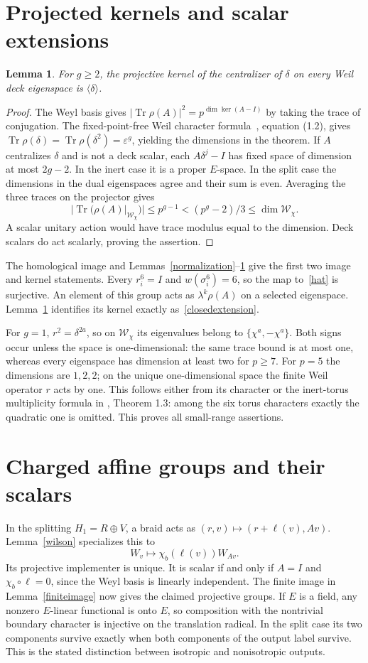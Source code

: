 \documentclass[11pt]{amsart}
\newtheorem{lemma}[theorem]{Lemma}
\newcommand{\Tr}{\operatorname{Tr}}
\begin{document}
\section{Projected kernels and scalar extensions}
\begin{lemma}\label{projectedkernel}
For $g\ge2$, the projective kernel of the centralizer of $\delta$
on every Weil deck eigenspace is $\langle\delta\rangle$.
\end{lemma}
\begin{proof}
The Weyl basis gives
$|\Tr\rho(A)|^2=p^{\dim\ker(A-I)}$ by taking the trace of conjugation.
The fixed-point-free Weil character formula~\cite{GH}, equation (1.2),
gives $\Tr\rho(\delta)=\Tr\rho(\delta^2)=\varepsilon^g$, yielding
the dimensions in the theorem. If $A$ centralizes $\delta$ and is
not a deck scalar, each $A\delta^j-I$ has fixed space of dimension
at most $2g-2$. In the inert case it is a proper $E$-space. In the
split case the dimensions in the dual eigenspaces agree and their
sum is even. Averaging the three traces on the projector gives
\[
|\Tr(\rho(A)|_{\mathscr W_\chi})|\le p^{g-1}
<(p^g-2)/3\le\dim\mathscr W_\chi.
\]
A scalar unitary action would have trace modulus equal to the
dimension. Deck scalars do act scalarly, proving the assertion.
\end{proof}

The homological image and Lemmas~\ref{normalization}--\ref{projectedkernel}
give the first two image and kernel statements. Every $r_i^6=I$
and $w(\sigma_i^6)=6$, so the map to~\eqref{hat} is surjective.
An element of this group acts as $\lambda^k\rho(A)$ on a selected
eigenspace. Lemma~\ref{projectedkernel} identifies its kernel exactly
as~\eqref{closedextension}.

For $g=1$, $r^2=\delta^{2a}$, so on $\mathscr W_\chi$ its eigenvalues
belong to $\{\chi^a,-\chi^a\}$. Both signs occur unless the space
is one-dimensional: the same trace bound is at most one, whereas
every eigenspace has dimension at least two for $p\ge7$.
For $p=5$ the dimensions are $1,2,2$; on the unique one-dimensional
space the finite Weil operator $r$ acts by one. This follows either
from its character or the inert-torus multiplicity formula in
\cite{GH}, Theorem 1.3: among the six torus characters exactly the
quadratic one is omitted. This proves all small-range assertions.

\section{Charged affine groups and their scalars}
In the splitting $H_1=R\oplus V$, a braid acts as
$(r,v)\mapsto(r+\ell(v),Av)$. Lemma~\ref{wilson} specializes this to
\[
W_v\longmapsto\chi_b(\ell(v))W_{Av}.
\]
Its projective implementer is unique. It is scalar if and only if
$A=I$ and $\chi_b\circ\ell=0$, since the Weyl basis is linearly
independent. The finite image in Lemma~\ref{finiteimage} now gives
the claimed projective groups. If $E$ is a field, any nonzero
$E$-linear functional is onto $E$, so composition with the nontrivial
boundary character is injective on the translation radical. In the
split case its two components survive exactly when both components
of the output label survive. This is the stated distinction between
isotropic and nonisotropic outputs.
\end{document}
